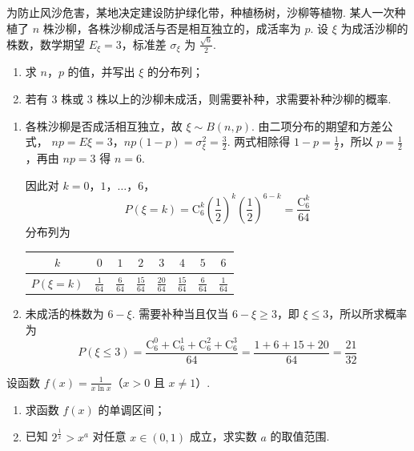 \begin{problem}
为防止风沙危害，某地决定建设防护绿化带，种植杨树，沙柳等植物. 某人一次种植了 \(n\) 株沙柳，各株沙柳成活与否是相互独立的，成活率为 \(p\). 设 \(\xi\) 为成活沙柳的株数，数学期望 \(E_{\xi} = 3\)，标准差 \(\sigma_{\xi}\) 为 \(\frac{\sqrt{6}}{2}\).

\begin{enumerate}
\item 求 \(n\)，\(p\) 的值，并写出 \(\xi\) 的分布列；
\item 若有 \(3\) 株或 \(3\) 株以上的沙柳未成活，则需要补种，求需要补种沙柳的概率.
\end{enumerate}
\end{problem}

\begin{solution}
\begin{enumerate}
\item
各株沙柳是否成活相互独立，故 \(\xi\sim B(n,p)\). 由二项分布的期望和方差公式，
\(np=E\xi=3\)，\(np(1-p)=\sigma_{\xi}^{2}=\frac32\).
两式相除得 \(1-p=\frac12\)，所以 \(p=\frac12\)，再由 \(np=3\) 得 \(n=6\).

因此对 \(k=0\)，\(1\)，\(\ldots\)，\(6\)，
\[
P(\xi=k)=\mathrm{C}_6^k\left(\frac12\right)^k\left(\frac12\right)^{6-k}=\frac{\mathrm{C}_6^k}{64}
\]
分布列为
\begin{center}
\begin{tabular}{c|ccccccc}
 \(k\)&\(0\)&\(1\)&\(2\)&\(3\)&\(4\)&\(5\)&\(6\)\\ \hline
 \(P(\xi=k)\)&\(\frac1{64}\)&\(\frac6{64}\)&\(\frac{15}{64}\)&\(\frac{20}{64}\)&\(\frac{15}{64}\)&\(\frac6{64}\)&\(\frac1{64}\)
\end{tabular}
\end{center}

\item
未成活的株数为 \(6-\xi\). 需要补种当且仅当 \(6-\xi\geqslant3\)，即 \(\xi\leqslant3\)，所以所求概率为
\[
P(\xi\leqslant3)=\frac{\mathrm{C}_6^0+\mathrm{C}_6^1+\mathrm{C}_6^2+\mathrm{C}_6^3}{64}
=\frac{1+6+15+20}{64}=\frac{21}{32}
\]
\end{enumerate}
\end{solution}

\begin{problem}
设函数 \( f(x) = \frac{1}{x \ln x} \)（\(x > 0\) 且 \(x \neq 1\)）.

\begin{enumerate}
\item 求函数 \( f(x) \) 的单调区间；
\item 已知 \(2^{\frac{1}{x}} > x^{a}\) 对任意 \(x \in (0,1)\) 成立，求实数 \(a\) 的取值范围.
\end{enumerate}
\end{problem}

